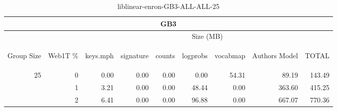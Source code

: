 \begin{center}
\begin{table}[htbp]
\begin{tabular}{ | r | r | r | r | r | r | r | r | r |}
\hline
\multicolumn{9}{|c|}{GB3}\\
\hline
 & & \multicolumn{7}{|c|}{Size (MB)}\\ \cline{3-9}
\begin{sideways}Group Size\end{sideways} & \begin{sideways}Web1T \% \end{sideways} & \begin{sideways}keys.mph\end{sideways} & \begin{sideways}signature\end{sideways} & \begin{sideways}counts\end{sideways} & \begin{sideways}logprobs\end{sideways} & \begin{sideways}vocabmap\end{sideways} & \begin{sideways}Authors Model \end{sideways} & \begin{sideways}TOTAL\end{sideways}\\
\hline
\multirow{2}{*}{25}
 & 0 & 0.00 & 0.00 & 0.00 & 0.00 & 54.31 & 89.19 & 143.49\\ \cline{2-9}
 & 1 & 3.21 & 0.00 & 0.00 & 48.44 & 0.00 & 363.60 & 415.25\\ \cline{2-9}
 & 2 & 6.41 & 0.00 & 0.00 & 96.88 & 0.00 & 667.07 & 770.36\\ \cline{2-9}
\hline
\end{tabular}
\caption{liblinear-enron-GB3-ALL-ALL-25}
\label{table:liblinear-enron-GB3-ALL-ALL-25}
\end{table}
\end{center}

